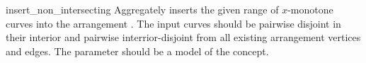 \begin{ccRefFunction}{insert_non_intersecting}
   {Aggregately inserts the given range of $x$-monotone curves
    \ccc{[first,last)} into the arrangement . The input curves should
    be pairwise disjoint in their interior and pairwise interrior-disjoint
    from all existing arrangement vertices and edges. 
    The  parameter should be a model of the
     concept.
    }

\end{ccRefFunction}
